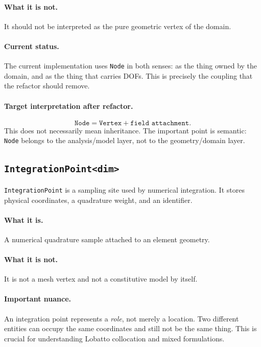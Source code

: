 \paragraph{What it is not.}
It should not be interpreted as the pure geometric vertex of the domain.

\paragraph{Current status.}
The current implementation uses \texttt{Node} in both senses: as the thing
owned by the domain, and as the thing that carries DOFs.  This is precisely
the coupling that the refactor should remove.

\paragraph{Target interpretation after refactor.}
\[
\texttt{Node} = \texttt{Vertex} + \texttt{field attachment}.
\]
This does not necessarily mean inheritance.  The important point is semantic:
\texttt{Node} belongs to the analysis/model layer, not to the geometry/domain
layer.


\subsection{\texttt{IntegrationPoint<dim>}}

\texttt{IntegrationPoint} is a sampling site used by numerical integration.
It stores physical coordinates, a quadrature weight, and an identifier.

\paragraph{What it is.}
A numerical quadrature sample attached to an element geometry.

\paragraph{What it is not.}
It is not a mesh vertex and not a constitutive model by itself.

\paragraph{Important nuance.}
An integration point represents a \emph{role}, not merely a location.  Two
different entities can occupy the same coordinates and still not be the same
thing.  This is crucial for understanding Lobatto collocation and mixed
formulations.


